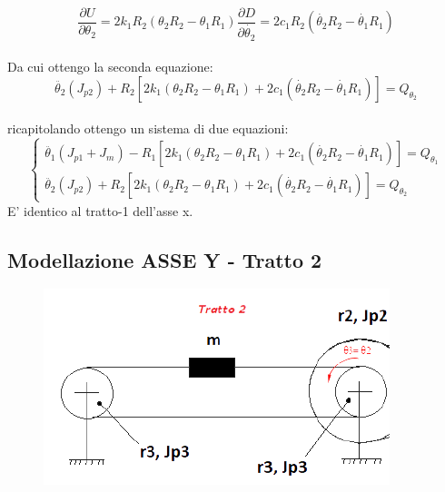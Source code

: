 \documentclass{article}
\begin{document}
\begin{equation*}
\frac{\partial U}{\partial \theta_{2}} = 2k_{1}R_{2}(\theta_{2}R_{2} - \theta_{1}R_{1})
\frac{\partial D}{\partial \dot{\theta_{2}}} = 2c_{1}R_{2}(\dot{\theta_{2}}R_{2} - \dot{\theta_{1}}R_{1})
\end{equation*}
\\
Da cui ottengo la seconda equazione: 
\\
\begin{equation*}
 \ddot{\theta_{2}}(J_{p2}) + R_{2}[2k_{1}(\theta_{2}R_{2}-\theta_{1}R_{1})+ 2c_{1}(\dot{\theta_{2}}R_{2}-\dot{\theta_{1}}R_{1})] = Q_{\theta_2}
\end{equation*}
\\
ricapitolando ottengo un sistema di due equazioni:
\begin{equation*}
\begin{cases}
\ddot{\theta_{1}}(J_{p1}+J_{m}) - R_{1}[2k_{1}(\theta_{2}R_{2}-\theta_{1}R_{1})+ 2c_{1}(\dot{\theta_{2}}R_{2}-\dot{\theta_{1}}R_{1})] = Q_{\theta_1}\\
\ddot{\theta_{2}}(J_{p2}) + R_{2}[2k_{1}(\theta_{2}R_{2}-\theta_{1}R_{1})+ 2c_{1}(\dot{\theta_{2}}R_{2}-\dot{\theta_{1}}R_{1})] = Q_{\theta_2}
\end{cases}
\end{equation*}
E' identico al tratto-1 dell'asse x.
\subsection{Modellazione ASSE Y - Tratto 2} 
\begin{figure}[H]
\centering
\includegraphics[width=.6\textwidth]{./assey/tratto2.png}
\end{figure}
\end{document}
